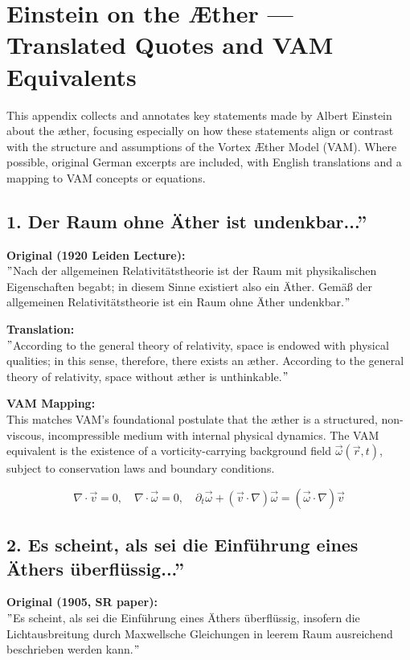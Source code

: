 \section{Einstein on the Æther — Translated Quotes and VAM Equivalents}

    This appendix collects and annotates key statements made by Albert Einstein about the æther, focusing especially on how these statements align or contrast with the structure and assumptions of the Vortex Æther Model (VAM). Where possible, original German excerpts are included, with English translations and a mapping to VAM concepts or equations.

    \subsection*{1. \grqq Der Raum ohne Äther ist undenkbar...\textquotedblright}
    \textbf{Original (1920 Leiden Lecture):} \\
    \("\)Nach der allgemeinen Relativitätstheorie ist der Raum mit physikalischen Eigenschaften begabt; in diesem Sinne existiert also ein Äther. Gemäß der allgemeinen Relativitätstheorie ist ein Raum ohne Äther undenkbar.\("\)

    \textbf{Translation:} \\
    \("\)According to the general theory of relativity, space is endowed with physical qualities; in this sense, therefore, there exists an æther. According to the general theory of relativity, space without æther is unthinkable.\("\)

    \textbf{VAM Mapping:} \\
    This matches VAM's foundational postulate that the æther is a structured, non-viscous, incompressible medium with internal physical dynamics. The VAM equivalent is the existence of a vorticity-carrying background field \( \vec{\omega}(\vec{r}, t) \), subject to conservation laws and boundary conditions.

    \[
    \nabla \cdot \vec{v} = 0, \quad \nabla \cdot \vec{\omega} = 0, \quad \partial_t \vec{\omega} + (\vec{v} \cdot \nabla) \vec{\omega} = (\vec{\omega} \cdot \nabla) \vec{v}
    \]

    \subsection*{2. \grqq Es scheint, als sei die Einführung eines Äthers überflüssig...\textquotedblright}
    \textbf{Original (1905, SR paper):} \\
    \("\)Es scheint, als sei die Einführung eines Äthers überflüssig, insofern die Lichtausbreitung durch Maxwell\rqs sche Gleichungen in leerem Raum ausreichend beschrieben werden kann.\("\)

